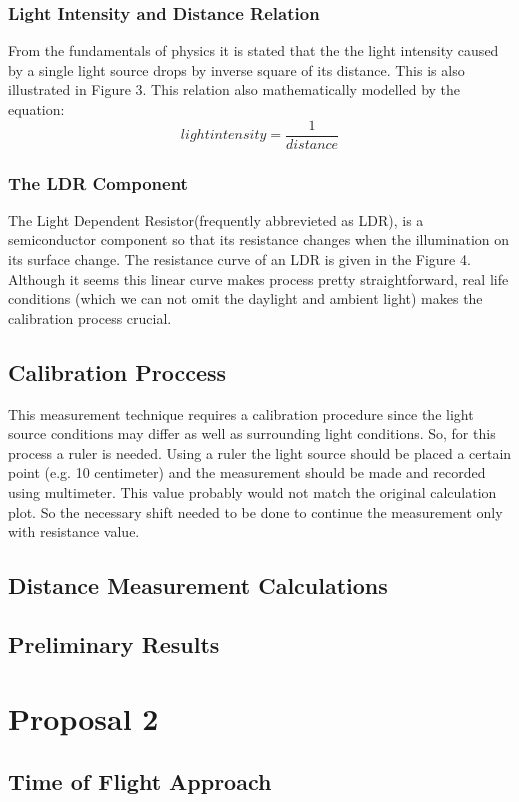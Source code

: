 \documentclass[letterpaper,12pt]{article}
\begin{document}
\subsubsection{Light Intensity and Distance Relation}
From the fundamentals of physics it is stated that the the light intensity caused by a single light source drops by inverse square of its distance. This is also illustrated in Figure 3.
This relation also mathematically modelled by the equation:
\[light intensity  = \frac{1}{distance}\]
\subsubsection{The LDR Component}
The Light Dependent Resistor(frequently abbrevieted as LDR), is a semiconductor component so that its  resistance changes when the illumination on its surface change. The resistance curve of an LDR is given in the Figure 4.
Although it seems this linear curve makes process pretty straightforward, real life conditions (which we can not omit the daylight and ambient light) makes the calibration process crucial.
\subsection{Calibration Proccess}
This measurement technique requires a calibration procedure since the light source conditions may differ as well as surrounding light conditions. So, for this process a ruler is needed. Using a ruler the light source should be placed a certain point (e.g. 10 centimeter) and the measurement should be made and recorded using multimeter. This value probably would not match the original calculation plot. So the necessary shift needed to be done to continue the measurement only with resistance value.
\subsection{Distance Measurement Calculations}

\subsection{Preliminary Results}

\section{Proposal 2}
\subsection{Time of Flight Approach}
\end{document}
